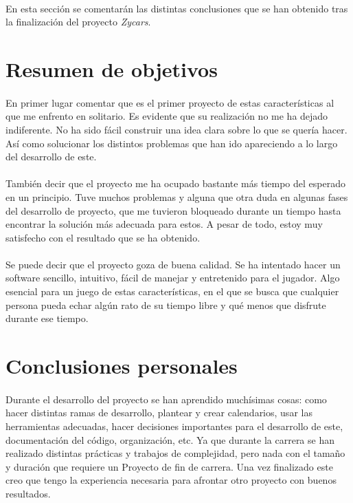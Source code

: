
\paragraph{}
En esta sección se comentarán las distintas conclusiones que se han obtenido tras la finalización del proyecto \emph{Zycars}.

\section{Resumen de objetivos}

\paragraph{}
En primer lugar comentar que es el primer proyecto de estas características al que me enfrento en solitario. Es evidente que su
realización no me ha dejado indiferente. No ha sido fácil construir una idea clara sobre lo que se quería hacer. Así como
solucionar los distintos problemas que han ido apareciendo a lo largo del desarrollo de este.

\paragraph{}
También decir que el proyecto me ha ocupado bastante más tiempo del esperado en un principio. Tuve muchos problemas y alguna que 
otra duda en algunas fases del desarrollo de proyecto, que me tuvieron bloqueado durante un tiempo hasta encontrar la solución
más adecuada para estos. A pesar de todo, estoy muy satisfecho con el resultado que se ha obtenido.

\paragraph{}
Se puede decir que el proyecto goza de buena calidad. Se ha intentado hacer un
software sencillo, intuitivo, fácil de manejar y 
entretenido para el jugador. Algo esencial para un juego de estas características, en el que se busca que cualquier persona
pueda echar algún rato de su tiempo libre y qué menos que disfrute durante ese tiempo.

\section{Conclusiones personales}

\paragraph{}
Durante el desarrollo del proyecto se han aprendido muchísimas cosas: como hacer distintas ramas de desarrollo, plantear y crear
calendarios, usar las herramientas adecuadas, hacer decisiones importantes para el desarrollo de este, documentación del 
código, organización, etc. Ya que durante la carrera se han realizado distintas prácticas y trabajos de complejidad, pero nada
con el tamaño y duración que requiere un Proyecto de fin de carrera. Una vez finalizado este creo que tengo la experiencia necesaria
para afrontar otro proyecto con buenos resultados.

